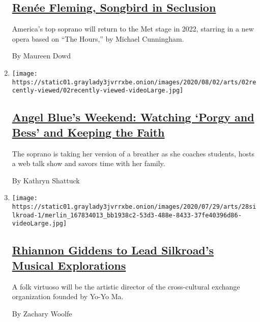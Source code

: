 \begin{enumerate}
  \hypertarget{renuxe9e-fleming-songbird-in-seclusion}{%
  \subsection{\texorpdfstring{\href{/2020/07/30/style/maureen-dowd-renee-fleming.html}{Renée
  Fleming, Songbird in
  Seclusion}}{Renée Fleming, Songbird in Seclusion}}\label{renuxe9e-fleming-songbird-in-seclusion}}

  America's top soprano will return to the Met stage in 2022, starring
  in a new opera based on ``The Hours,'' by Michael Cunningham.

  By Maureen Dowd
\item
  \texttt{[image: https://static01.graylady3jvrrxbe.onion/images/2020/08/02/arts/02recently-viewed/02recently-viewed-videoLarge.jpg]}

  \hypertarget{angel-blues-weekend-watching-porgy-and-bess-and-keeping-the-faith}{%
  \subsection{\texorpdfstring{\href{/2020/07/28/arts/music/angel-blue-favorites.html}{Angel
  Blue's Weekend: Watching `Porgy and Bess' and Keeping the
  Faith}}{Angel Blue's Weekend: Watching `Porgy and Bess' and Keeping the Faith}}\label{angel-blues-weekend-watching-porgy-and-bess-and-keeping-the-faith}}

  The soprano is taking her version of a breather as she coaches
  students, hosts a web talk show and savors time with her family.

  By Kathryn Shattuck
\item
  \texttt{[image: https://static01.graylady3jvrrxbe.onion/images/2020/07/29/arts/28silkroad-1/merlin\_167834013\_bb1938c2-53d3-488e-8433-37fe40396d86-videoLarge.jpg]}

  \hypertarget{rhiannon-giddens-to-lead-silkroads-musical-explorations}{%
  \subsection{\texorpdfstring{\href{/2020/07/28/arts/music/rhiannon-giddens-silkroad.html}{Rhiannon
  Giddens to Lead Silkroad's Musical
  Explorations}}{Rhiannon Giddens to Lead Silkroad's Musical Explorations}}\label{rhiannon-giddens-to-lead-silkroads-musical-explorations}}

  A folk virtuoso will be the artistic director of the cross-cultural
  exchange organization founded by Yo-Yo Ma.

  By Zachary Woolfe
\end{enumerate}

